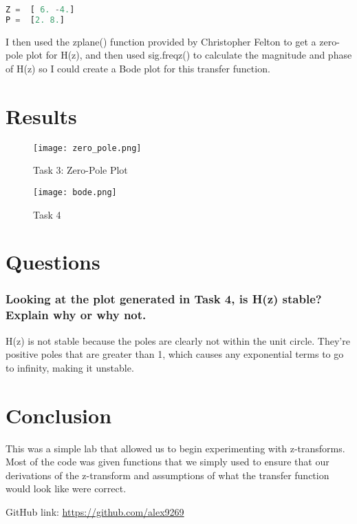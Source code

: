 \documentclass[12pt]{report}
\begin{document}
\begin{lstlisting}[language=Python]
Z =  [ 6. -4.]
P =  [2. 8.]
\end{lstlisting}

I then used the zplane() function provided by Christopher Felton to get a zero-pole plot for H(z), and then used sig.freqz() to calculate the magnitude and phase of H(z) so I could create a Bode plot for this transfer function.

 \section{Results}
 
\begin{figure}[H]
    \centering
    \texttt{[image: zero\_pole.png]}
    \caption{Task 3: Zero-Pole Plot}
\end{figure}

\begin{figure}[H]
    \centering
    \texttt{[image: bode.png]}
    \caption{Task 4}
\end{figure}
 
 \section{Questions}
 \subsubsection{Looking at the plot generated in Task 4, is H(z) stable? Explain why or why not.}
 
 H(z) is not stable because the poles are clearly not within the unit circle. They're positive poles that are greater than 1, which causes any exponential terms to go to infinity, making it unstable.

\newpage
 \section{Conclusion}
 
This was a simple lab that allowed us to begin experimenting with z-transforms. Most of the code was given functions that we simply used to ensure that our derivations of the z-transform and assumptions of what the transfer function would look like were correct. 
 
 GitHub link: \url{https://github.com/alex9269}
 
\end{document}
